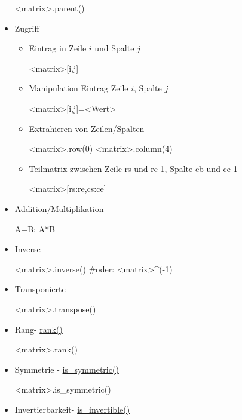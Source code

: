 \documentclass[a4paper,9pt,DIV15,twocolumn]{scrartcl}
\begin{document}
\begin{itemize}
\begin{sagein}
<matrix>.parent()
\end{sagein}
\item Zugriff
\begin{itemize}
 \item Eintrag in Zeile $i$ und Spalte $j$
\begin{sagein}
<matrix>[i,j]%
\end{sagein}
\item Manipulation Eintrag Zeile $i$, Spalte $j$
\begin{sagein}
<matrix>[i,j]=<Wert>
\end{sagein}
\item Extrahieren von Zeilen/Spalten
\begin{sagein}
<matrix>.row(0)
<matrix>.column(4)
\end{sagein}
\item Teilmatrix zwischen Zeile rs und re-1, Spalte cb und ce-1
	\begin{sagein}
<matrix>[rs:re,cs:ce]
	\end{sagein}
\end{itemize}
\item Addition/Multiplikation
\begin{sagein}
A+B; A*B
\end{sagein}
\item Inverse
	\begin{sagein}
<matrix>.inverse() #oder: <matrix>^(-1)
	\end{sagein}
\item Transponierte
	\begin{sagein}
<matrix>.transpose()
	\end{sagein}
\item Rang- \href{https://sage.math.uni-goettingen.de/doc/static/reference/sage/matrix/matrix0.html?highlight=matrix.rank#sage.matrix.matrix0.Matrix.rank}{rank()}
\begin{sagein}
<matrix>.rank()        
\end{sagein}
\item Symmetrie - \href{https://sage.math.uni-goettingen.de/doc/static/reference/sage/matrix/matrix0.html?highlight=matrix.rank#sage.matrix.matrix0.Matrix.is_symmetric}{is\_symmetric()}
\begin{sagein}
<matrix>.is_symmetric() 
\end{sagein}
\item Invertierbarkeit- \href{https://sage.math.uni-goettingen.de/doc/static/reference/sage/matrix/matrix0.html?highlight=matrix.rank#sage.matrix.matrix0.Matrix.is_invertible}{is\_invertible()}

\end{itemize}
\end{document}
